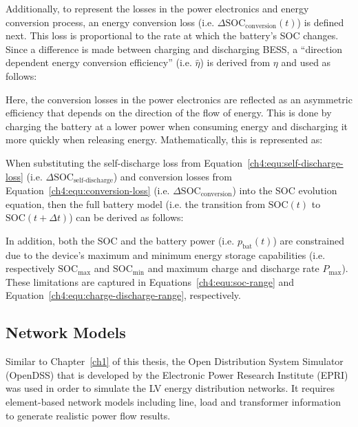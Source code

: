 

Additionally, to represent the losses in the power electronics and energy conversion process, an energy conversion loss (i.e. $\Delta\text{SOC}_\text{conversion}(t)$) is defined next.
This loss is proportional to the rate at which the battery's SOC changes.
Since a difference is made between charging and discharging BESS, a ``direction dependent energy conversion efficiency'' (i.e. $\hat{\eta}$) is derived from $\eta$ and used as follows:



Here, the conversion losses in the power electronics are reflected as an asymmetric efficiency that depends on the direction of the flow of energy.
This is done by charging the battery at a lower power when consuming energy and discharging it more quickly when releasing energy.
Mathematically, this is represented as:



When substituting the self-discharge loss from Equation~\ref{ch4:equ:self-discharge-loss} (i.e. $\Delta\text{SOC}_\text{self-discharge}$) and conversion losses from Equation~\ref{ch4:equ:conversion-loss} (i.e. $\Delta\text{SOC}_\text{conversion}$) into the SOC evolution equation, then the full battery model (i.e. the transition from $\text{SOC}(t)$ to $\text{SOC}(t+\Delta t)$) can be derived as follows:



In addition, both the SOC and the battery power (i.e. $p_\text{bat}(t)$) are constrained due to the device's maximum and minimum energy storage capabilities (i.e. respectively $\text{SOC}_\text{max}$ and $\text{SOC}_\text{min}$ and maximum charge and discharge rate $P_\text{max}$).
These limitations are captured in Equations~\ref{ch4:equ:soc-range} and Equation~\ref{ch4:equ:charge-discharge-range}, respectively.





\subsection{Network Models}
\label{ch4:subsec:network-models}

Similar to Chapter~\ref{ch1} of this thesis, the Open Distribution System Simulator (OpenDSS) that is developed by the Electronic Power Research Institute (EPRI) was used in order to simulate the LV energy distribution networks.
It requires element-based network models including line, load and transformer information to generate realistic power flow results.

